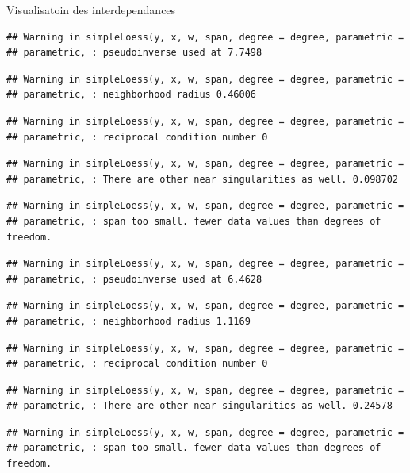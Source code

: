 \documentclass[11pt,ignorenonframetext,]{beamer}
\begin{document}
\begin{frame}[fragile]{Visualisatoin des interdependances}
\begin{verbatim}
## Warning in simpleLoess(y, x, w, span, degree = degree, parametric =
## parametric, : pseudoinverse used at 7.7498
\end{verbatim}

\begin{verbatim}
## Warning in simpleLoess(y, x, w, span, degree = degree, parametric =
## parametric, : neighborhood radius 0.46006
\end{verbatim}

\begin{verbatim}
## Warning in simpleLoess(y, x, w, span, degree = degree, parametric =
## parametric, : reciprocal condition number 0
\end{verbatim}

\begin{verbatim}
## Warning in simpleLoess(y, x, w, span, degree = degree, parametric =
## parametric, : There are other near singularities as well. 0.098702
\end{verbatim}

\begin{verbatim}
## Warning in simpleLoess(y, x, w, span, degree = degree, parametric =
## parametric, : span too small. fewer data values than degrees of freedom.
\end{verbatim}

\begin{verbatim}
## Warning in simpleLoess(y, x, w, span, degree = degree, parametric =
## parametric, : pseudoinverse used at 6.4628
\end{verbatim}

\begin{verbatim}
## Warning in simpleLoess(y, x, w, span, degree = degree, parametric =
## parametric, : neighborhood radius 1.1169
\end{verbatim}

\begin{verbatim}
## Warning in simpleLoess(y, x, w, span, degree = degree, parametric =
## parametric, : reciprocal condition number 0
\end{verbatim}

\begin{verbatim}
## Warning in simpleLoess(y, x, w, span, degree = degree, parametric =
## parametric, : There are other near singularities as well. 0.24578
\end{verbatim}

\begin{verbatim}
## Warning in simpleLoess(y, x, w, span, degree = degree, parametric =
## parametric, : span too small. fewer data values than degrees of freedom.
\end{verbatim}


\end{frame}
\end{document}
